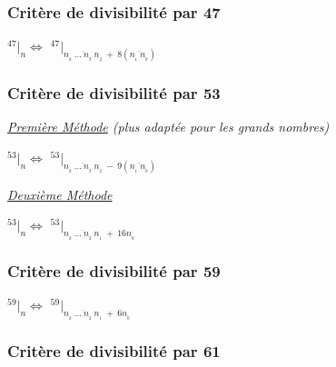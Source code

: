 \documentclass[a4paper, twoside]{article}
\begin{document}
	\vfill
	{\noindent \dotfill}


	\subsubsection*{Critère de divisibilité par 47}

	\begin{center}
		\huge
		$ ^{47}|_n \Leftrightarrow$ $^{47}|_{\overline{n_{_{k}}~\dots~n_{_3}~n_{_2}}~+~8\left(\overline{n_{_1}~n_{_0}}\right)} $
	\end{center}

	\newpage






	\subsubsection*{Critère de divisibilité par 53}

	{\noindent  \textit{\underline{Première Méthode} (plus adaptée pour les grands nombres)}}	

	\begin{center}
		\huge
		$ ^{53}|_n \Leftrightarrow$ $^{53}|_{\overline{n_{_{k}}~\dots~n_{_3}~n_{_2}}~-~9\left(\overline{n_{_1}~n_{_0}}\right)} $
		
	\end{center}


	{\noindent  \textit{\underline{Deuxième Méthode}}}

	\begin{center}
		\huge
		$ ^{53}|_n \Leftrightarrow$ $^{53}|_{\overline{n_{_{k}}~\dots~n_{_2}~n_{_1}}~+~16n_{_0}} $
	\end{center}

	\vfill
	{\noindent \dotfill}

	\subsubsection*{Critère de divisibilité par 59}

	\begin{center}
		\huge
		$ ^{59}|_n \Leftrightarrow$ $^{59}|_{\overline{n_{_{k}}~\dots~n_{_2}~n_{_1}}~+~6n_{_0}} $
	\end{center}

	\vfill
	{\noindent \dotfill}

	\subsubsection*{Critère de divisibilité par 61}
\end{document}
